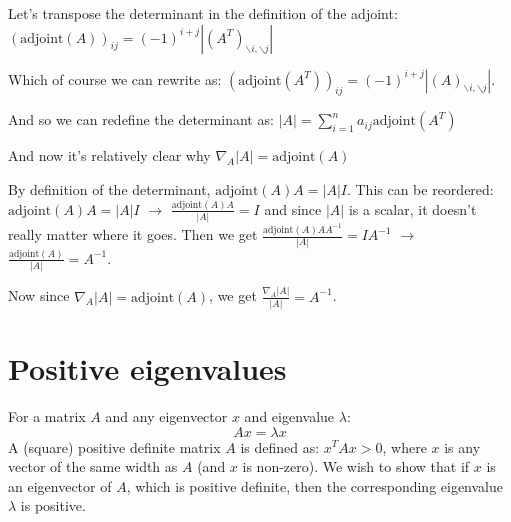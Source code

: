\documentclass[11pt]{report}
\begin{document}
Let's transpose the determinant in the definition of the adjoint:
$(\text{adjoint}(A))_{ij} = (-1)^{i+j}|(A^T)_{\backslash i,\backslash j}|$

Which of course we can rewrite as:
$(\text{adjoint}(A^T))_{ij} = (-1)^{i+j}|(A)_{\backslash i,\backslash j}|$.

And so we can redefine the determinant as:
$|A| = \sum^n_{i=1} a_{ij} \text{adjoint}(A^T)$

And now it's relatively clear why $\nabla_A |A| = \text{adjoint}(A)$




By definition of the determinant, $\text{adjoint}(A)A = |A|I$. %
This can be reordered: $\text{adjoint}(A)A = |A|I$ $\rightarrow$ $\frac{\text{adjoint}(A)A}{|A|} = I$ and since $|A|$ is a scalar, it doesn't really matter where it goes. Then we get $\frac{\text{adjoint}(A)AA^{-1}}{|A|} = IA^{-1}$ $\rightarrow$ $\frac{\text{adjoint}(A)}{|A|} = A^{-1}$.

Now since $\nabla_A |A| = \text{adjoint}(A)$, we get $\frac{\nabla_A |A|}{|A|} = A^{-1}$.

\section{Positive eigenvalues}

For a matrix $A$ and any eigenvector $x$ and eigenvalue $\lambda$:
\[ Ax = \lambda x \]
A (square) positive definite matrix $A$ is defined as: $x^TAx > 0$, where $x$ is any vector of the same width as $A$ (and $x$ is non-zero).
We wish to show that if $x$ is an eigenvector of $A$, which is positive definite, then the corresponding eigenvalue $\lambda$ is positive.
\end{document}
